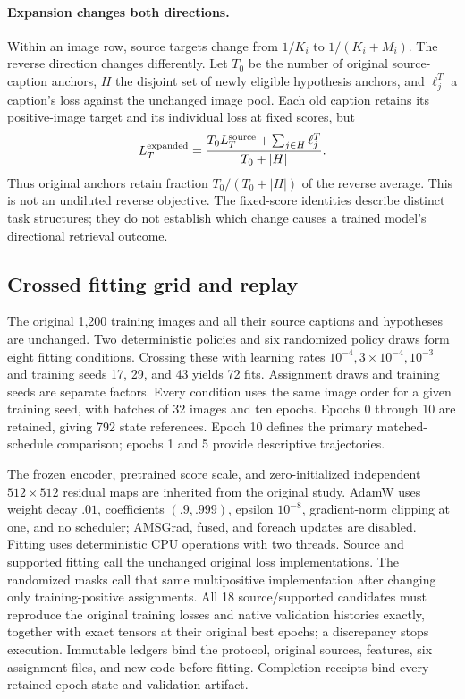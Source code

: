 \paragraph{Expansion changes both directions.}
Within an image row, source targets change from $1/K_i$ to $1/(K_i+M_i)$. The reverse direction changes differently. Let $T_0$ be the number of original source-caption anchors, $H$ the disjoint set of newly eligible hypothesis anchors, and $\ell_j^T$ a caption's loss against the unchanged image pool. Each old caption retains its positive-image target and its individual loss at fixed scores, but
\begin{equation}
L_T^{\rm expanded}
=\frac{T_0L_T^{\rm source}+\sum_{j\in H}\ell_j^T}{T_0+|H|}.
\label{eq:followupreverse}
\end{equation}
Thus original anchors retain fraction $T_0/(T_0+|H|)$ of the reverse average. This is not an undiluted reverse objective. The fixed-score identities describe distinct task structures; they do not establish which change causes a trained model's directional retrieval outcome.

\subsection{Crossed fitting grid and replay}
\label{app:followuptraining}
The original 1,200 training images and all their source captions and hypotheses are unchanged. Two deterministic policies and six randomized policy draws form eight fitting conditions. Crossing these with learning rates $10^{-4},3\times10^{-4},10^{-3}$ and training seeds 17, 29, and 43 yields 72 fits. Assignment draws and training seeds are separate factors. Every condition uses the same image order for a given training seed, with batches of 32 images and ten epochs. Epochs 0 through 10 are retained, giving 792 state references. Epoch 10 defines the primary matched-schedule comparison; epochs 1 and 5 provide descriptive trajectories.

The frozen encoder, pretrained score scale, and zero-initialized independent $512\times512$ residual maps are inherited from the original study. AdamW uses weight decay $.01$, coefficients $(.9,.999)$, epsilon $10^{-8}$, gradient-norm clipping at one, and no scheduler; AMSGrad, fused, and foreach updates are disabled. Fitting uses deterministic CPU operations with two threads. Source and supported fitting call the unchanged original loss implementations. The randomized masks call that same multipositive implementation after changing only training-positive assignments. All 18 source/supported candidates must reproduce the original training losses and native validation histories exactly, together with exact tensors at their original best epochs; a discrepancy stops execution. Immutable ledgers bind the protocol, original sources, features, six assignment files, and new code before fitting. Completion receipts bind every retained epoch state and validation artifact.

